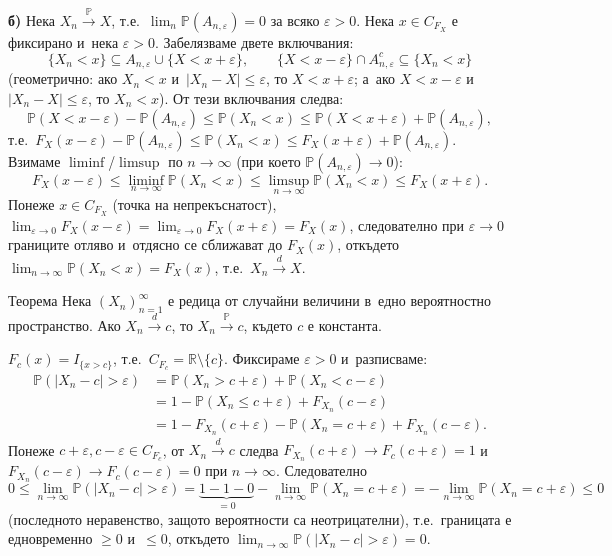 \begin{proofbox}
\textbf{б)} Нека $X_n\xrightarrow{\mathbb P}X$, т.е.\
$\lim_n\mathbb P(A_{n,\varepsilon})=0$ за всяко $\varepsilon>0$. Нека
$x\in C_{F_X}$ е фиксирано и~нека $\varepsilon>0$. Забелязваме
двете включвания:
\[
  \{X_n<x\} \subseteq A_{n,\varepsilon}\cup\{X<x+\varepsilon\},
  \qquad
  \{X<x-\varepsilon\}\cap A_{n,\varepsilon}^c \subseteq \{X_n<x\}
\]
(геометрично: ако $X_n<x$ и~$|X_n-X|\le\varepsilon$, то $X<x+
\varepsilon$; а~ако $X<x-\varepsilon$ и~$|X_n-X|\le\varepsilon$, то
$X_n<x$). От тези включвания следва:
\[
  \mathbb P(X<x-\varepsilon) - \mathbb P(A_{n,\varepsilon}) \le \mathbb P(X_n<x) \le \mathbb P(X<x+\varepsilon)+\mathbb P(A_{n,\varepsilon}),
\]
т.е.\ $F_X(x-\varepsilon)-\mathbb P(A_{n,\varepsilon})\le
\mathbb P(X_n<x)\le F_X(x+\varepsilon)+\mathbb P(A_{n,\varepsilon})$.
Взимаме $\liminf$/$\limsup$ по $n\to\infty$ (при което $\mathbb
P(A_{n,\varepsilon})\to0$):
\[
  F_X(x-\varepsilon) \le \liminf_{n\to\infty}\mathbb P(X_n<x) \le \limsup_{n\to\infty}\mathbb P(X_n<x) \le F_X(x+\varepsilon).
\]
Понеже $x\in C_{F_X}$ (точка на непрекъснатост), $\lim_{\varepsilon
\to0}F_X(x-\varepsilon)=\lim_{\varepsilon\to0}F_X(x+\varepsilon)=
F_X(x)$, следователно при $\varepsilon\to0$ границите отляво и~отдясно се сближават до $F_X(x)$, откъдето
$\lim_{n\to\infty}\mathbb P(X_n<x)=F_X(x)$, т.е.\ $X_n
\xrightarrow{d}X$. \qedbg
\end{proofbox}

\begin{thmbox}[]{Теорема}
Нека $(X_n)_{n=1}^{\infty}$ е редица от случайни величини в~едно
вероятностно пространство. Ако $X_n\xrightarrow{d}c$, то
$X_n\xrightarrow{\mathbb P}c$, където $c$ е константа.
\end{thmbox}

\begin{proofbox}
$F_c(x) = I_{\{x>c\}}$, т.е.\ $C_{F_c}=\mathbb R\setminus\{c\}$.
Фиксираме $\varepsilon>0$ и~разписваме:
\begin{align*}
  \mathbb P(|X_n-c|>\varepsilon) &= \mathbb P(X_n>c+\varepsilon)+\mathbb P(X_n<c-\varepsilon)\\
  &= 1-\mathbb P(X_n\le c+\varepsilon) + F_{X_n}(c-\varepsilon)\\
  &= 1 - F_{X_n}(c+\varepsilon) - \mathbb P(X_n=c+\varepsilon) + F_{X_n}(c-\varepsilon).
\end{align*}
Понеже $c+\varepsilon,c-\varepsilon\in C_{F_c}$, от $X_n
\xrightarrow{d}c$ следва $F_{X_n}(c+\varepsilon)\to F_c(c+\varepsilon)
=1$ и~$F_{X_n}(c-\varepsilon)\to F_c(c-\varepsilon)=0$ при
$n\to\infty$. Следователно
\[
  0 \le \lim_{n\to\infty}\mathbb P(|X_n-c|>\varepsilon) = \underbrace{1-1-0}_{=0} - \lim_{n\to\infty}\mathbb P(X_n=c+\varepsilon) = -\lim_{n\to\infty}\mathbb P(X_n=c+\varepsilon) \le 0
\]
(последното неравенство, защото вероятности са неотрицателни), т.е.\
границата е едновременно $\ge0$ и~$\le0$, откъдето $\lim_{n\to
\infty}\mathbb P(|X_n-c|>\varepsilon)=0$. \qedbg
\end{proofbox}

